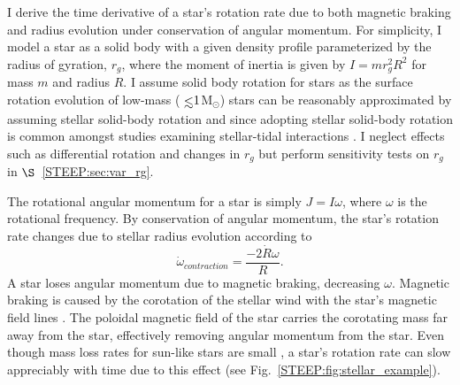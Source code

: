 I derive the time derivative of a star's rotation rate due to both magnetic braking and radius evolution under conservation of angular momentum.  For simplicity, I model a star as a solid body with a given density profile parameterized by the radius of gyration, $r_g$, where the moment of inertia is given by $I = m r_g^2 R^2$ for mass $m$ and radius $R$.  I assume solid body rotation for stars as the surface rotation evolution of low-mass (${\lsim}1$M$_{\odot}$) stars can be reasonably approximated by assuming stellar solid-body rotation \citep{Bouvier1997} and since adopting stellar solid-body rotation is common amongst studies examining stellar-tidal interactions \citep[e.g.][]{DobbsDixon2004,Heller2011,Barnes2013,Repetto2014,Bolmont2016,Bolmont2017}.  I neglect effects such as differential rotation and changes in $r_g$ but perform sensitivity tests on $r_g$ in $\S$~\ref{STEEP:sec:var_rg}.

The rotational angular momentum for a star is simply $J = I \omega$, where $\omega$ is the rotational frequency.  By conservation of angular momentum, the star's rotation rate changes due to stellar radius evolution according to
\begin{equation} \label{STEEP:eqn:rot_ang_mom_dt}
\dot{\omega}_{contraction} = \frac{-2 \dot{R} \omega}{R}.
\end{equation}
A star loses angular momentum due to magnetic braking, decreasing $\omega$.  Magnetic braking is caused by the corotation of the stellar wind with the star's magnetic field lines \citep[see][]{Parker1958,Mestel1968}.  The poloidal magnetic field of the star carries the corotating mass far away from the star, effectively removing angular momentum from the star.  Even though mass loss rates for sun-like stars are small \citep[e.g., $\dot{M}{\sim}10^{-14}$ M$_{\odot}$/yr;][]{Tarduno2014}, a star's rotation rate can slow appreciably with time due to this effect (see Fig.~\ref{STEEP:fig:stellar_example}).  

